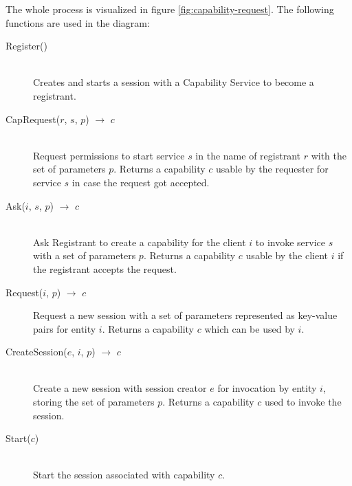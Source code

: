 The whole process is visualized in figure \ref{fig:capability-request}.
The following functions are used in the diagram:
\begin{description}
    \item[Register()]\hfill\\
        Creates and starts a session with a Capability Service to become a registrant.
    \item[CapRequest($r$, $s$, $p$) $\rightarrow$ $c$]\hfill\\
        Request permissions to start service $s$ in the name of registrant $r$ with the set of parameters $p$.
        Returns a capability $c$ usable by the requester for service $s$ in case the request got accepted.
    \item[Ask($i$, $s$, $p$) $\rightarrow$ $c$]\hfill\\
        Ask Registrant to create a capability for the client $i$ to invoke service $s$ with a set of parameters $p$.
        Returns a capability $c$ usable by the client $i$ if the registrant accepts the request.
    \item[Request($i$, $p$) $\rightarrow$ $c$]
        Request a new session with a set of parameters represented as key-value pairs for entity $i$.
        Returns a capability $c$ which can be used by $i$.
    \item[CreateSession($e$, $i$, $p$) $\rightarrow$ $c$]\hfill\\
        Create a new session with session creator $e$ for invocation by entity $i$, storing the set of parameters $p$.
        Returns a capability $c$ used to invoke the session.
    \item[Start($c$)]\hfill\\
        Start the session associated with capability $c$.
\end{description}

